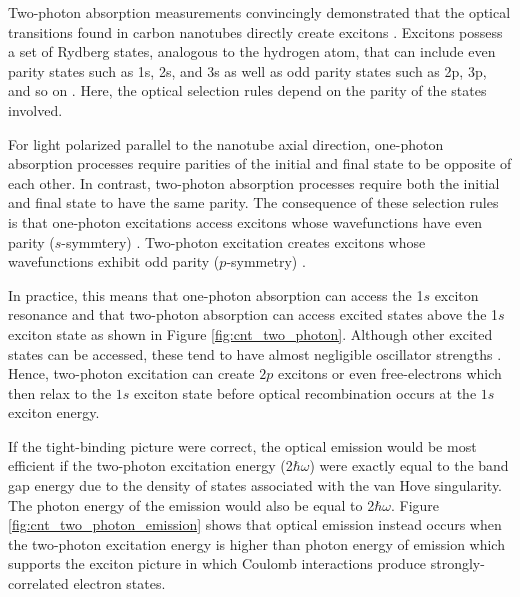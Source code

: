 Two-photon absorption measurements convincingly demonstrated that the optical transitions found in carbon nanotubes directly create excitons \cite{wang2005optical, maultzsch2005exciton}. Excitons possess a set of Rydberg states, analogous to the hydrogen atom, that can include even parity states such as 1s, 2s, and 3s as well as odd parity states such as 2p, 3p, and so on \cite{wang2005optical}. Here, the optical selection rules depend on the parity of the states involved.

For light polarized parallel to the nanotube axial direction, one-photon absorption processes require parities of the initial and final state to be opposite of each other. In contrast, two-photon absorption processes require both the initial and final state to have the same parity. The consequence of these selection rules is that one-photon excitations access excitons whose wavefunctions have even parity ($s$-symmtery) \cite{wang2005optical}. Two-photon excitation creates excitons whose wavefunctions exhibit odd parity ($p$-symmetry) \cite{wang2005optical}.

In practice, this means that one-photon absorption can access the 1$s$ exciton resonance and that two-photon absorption can access excited states above the 1$s$ exciton state as shown in Figure \ref{fig:cnt_two_photon}. Although other excited states can be accessed, these tend to have almost negligible oscillator strengths \cite{wang2005optical}. Hence, two-photon excitation can create $2p$ excitons or even free-electrons which then relax to the $1s$ exciton state before optical recombination occurs at the $1s$ exciton energy.

If the tight-binding picture were correct, the optical emission would be most efficient if the two-photon excitation energy (2$\hbar \omega$) were exactly equal to the band gap energy due to the density of states associated with the van Hove singularity. The photon energy of the emission would also be equal to 2$\hbar \omega$. Figure \ref{fig:cnt_two_photon_emission} shows that optical emission instead occurs when the two-photon excitation energy is higher than photon energy of emission which supports the exciton picture in which Coulomb interactions produce strongly-correlated electron states.

